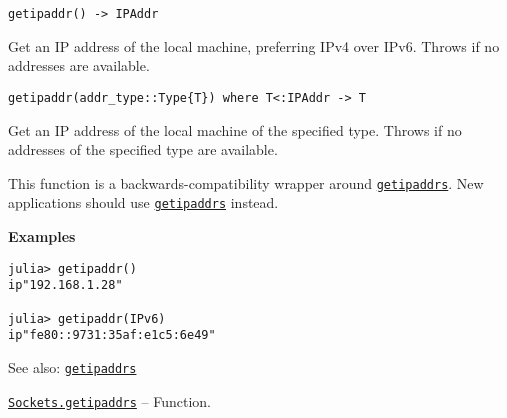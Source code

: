 \begin{adjustwidth}{2em}{0pt}


\begin{verbatim}
getipaddr() -> IPAddr
\end{verbatim}

Get an IP address of the local machine, preferring IPv4 over IPv6. Throws if no addresses are available.


\begin{lstlisting}
getipaddr(addr_type::Type{T}) where T<:IPAddr -> T
\end{lstlisting}

Get an IP address of the local machine of the specified type. Throws if no addresses of the specified type are available.

This function is a backwards-compatibility wrapper around \hyperlink{11225054155479915290}{\texttt{getipaddrs}}. New applications should use \hyperlink{11225054155479915290}{\texttt{getipaddrs}} instead.

\textbf{Examples}


\begin{verbatim}
julia> getipaddr()
ip"192.168.1.28"

julia> getipaddr(IPv6)
ip"fe80::9731:35af:e1c5:6e49"
\end{verbatim}

See also: \hyperlink{11225054155479915290}{\texttt{getipaddrs}}



\end{adjustwidth}
\hypertarget{11225054155479915290}{}
\hyperlink{11225054155479915290}{\texttt{Sockets.getipaddrs}}  -- {Function.}

